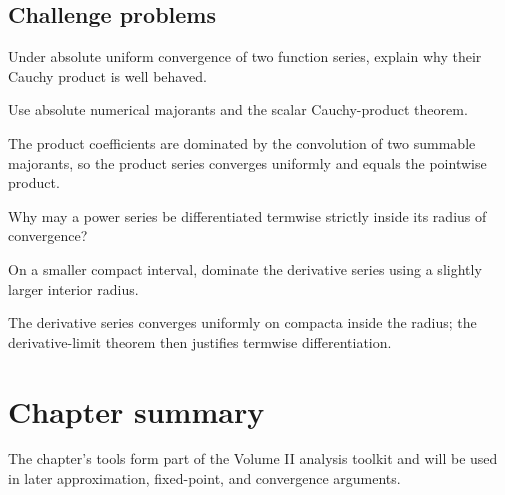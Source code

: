 \subsection*{Challenge problems}

\begin{exercise}\label{exr:ii13-expand-15}
Under absolute uniform convergence of two function series, explain why their Cauchy product is well behaved.
\end{exercise}
\begin{hint}
Use absolute numerical majorants and the scalar Cauchy-product theorem.
\end{hint}
\begin{solution}
The product coefficients are dominated by the convolution of two summable majorants, so the product series converges uniformly and equals the pointwise product.
\end{solution}

\begin{exercise}\label{exr:ii13-expand-16}
Why may a power series be differentiated termwise strictly inside its radius of convergence?
\end{exercise}
\begin{hint}
On a smaller compact interval, dominate the derivative series using a slightly larger interior radius.
\end{hint}
\begin{solution}
The derivative series converges uniformly on compacta inside the radius; the derivative-limit theorem then justifies termwise differentiation.
\end{solution}
\section*{Chapter summary}
The chapter's tools form part of the Volume II analysis toolkit and will be used in later approximation, fixed-point, and convergence arguments.
